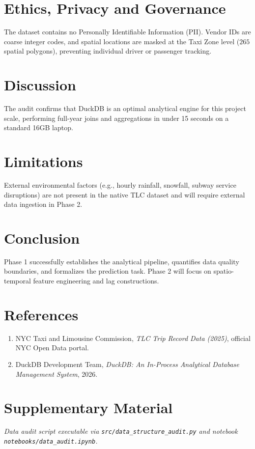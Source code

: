 \documentclass[11pt,a4paper]{article}
\begin{document}
\section{Ethics, Privacy and Governance}
The dataset contains no Personally Identifiable Information (PII). Vendor IDs are coarse integer codes, and spatial locations are masked at the Taxi Zone level ($265$ spatial polygons), preventing individual driver or passenger tracking.

\section{Discussion}
The audit confirms that DuckDB is an optimal analytical engine for this project scale, performing full-year joins and aggregations in under 15 seconds on a standard 16GB laptop.

\section{Limitations}
External environmental factors (e.g., hourly rainfall, snowfall, subway service disruptions) are not present in the native TLC dataset and will require external data ingestion in Phase 2.

\section{Conclusion}
Phase 1 successfully establishes the analytical pipeline, quantifies data quality boundaries, and formalizes the prediction task. Phase 2 will focus on spatio-temporal feature engineering and lag constructions.

\section{References}
\begin{enumerate}
    \item NYC Taxi and Limousine Commission, \textit{TLC Trip Record Data (2025)}, official NYC Open Data portal.
    \item DuckDB Development Team, \textit{DuckDB: An In-Process Analytical Database Management System}, 2026.
\end{enumerate}

\section{Supplementary Material}
\textit{Data audit script executable via \texttt{src/data\_structure\_audit.py} and notebook \texttt{notebooks/data\_audit.ipynb}.}
\end{document}
